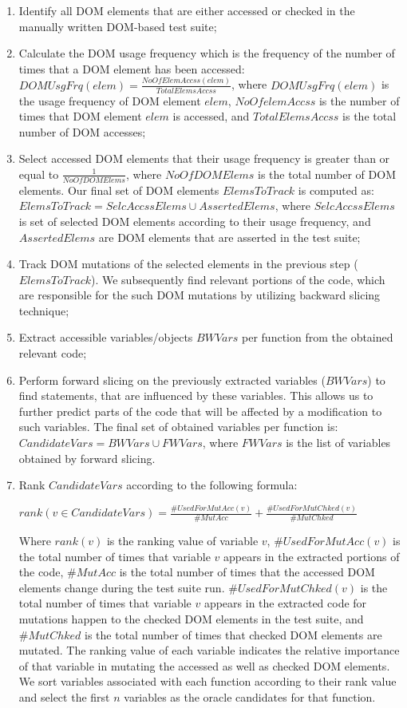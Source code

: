 \begin{enumerate}
\item Identify all DOM elements
that are either accessed or checked in the manually written DOM-based test suite; 
\item Calculate the DOM usage frequency which is the frequency of the number of times that a DOM element has been accessed:
$DOMUsgFrq(elem)=\frac{NoOfElemAccss(elem)}{TotalElemsAccss}$, where $DOMUsgFrq(elem)$ is the usage frequency of DOM element $elem$, $NoOfelemAccss$ is the number of times that DOM element $elem$ is accessed, and $TotalElemsAccss$ is the total number of DOM accesses;
\item Select accessed DOM elements that their usage frequency is greater than or equal to $\frac{1}{NoOfDOMElems}$, where $NoOfDOMElems$ is the total number of DOM elements. Our final set of DOM elements $ElemsToTrack$ is computed as:
$ElemsToTrack=SelcAccssElems\cup AssertedElems$, where $SelcAccssElems$ is set of selected DOM elements according to their usage frequency, and $AssertedElems$ are DOM elements that are asserted in the test suite;    
\item Track DOM mutations of the selected elements in the previous step ($ElemsToTrack$). We subsequently find relevant portions of the code, which are responsible for the such DOM mutations by utilizing backward slicing technique; 
\item Extract accessible variables/objects $BWVars$ per function from the obtained relevant code;
\item Perform forward slicing on the previously extracted variables ($BWVars$) to find statements, that are influenced by these variables. This allows us to further predict parts of the code that will be affected by a modification to such variables. The final set of obtained variables per function is: $CandidateVars=BWVars\cup FWVars$, where $FWVars$ is the list of variables obtained by forward slicing.  
\item Rank $CandidateVars$ according to the following formula:

$rank(v\in CandidateVars)=\frac{\# UsedForMutAcc(v)}{\# MutAcc} + \frac{\# UsedForMutChked(v)}{\# MutChked}$

Where $rank(v)$ is the ranking value of variable $v$, $\# UsedForMutAcc(v)$ is the total number of
times that variable $v$ appears in the extracted portions of the code, $\# MutAcc$ is the total number of times that the
accessed DOM elements change during the test suite run. $\# UsedForMutChked(v)$ is the total
number of times that variable $v$ appears in the extracted code for mutations happen to the checked
DOM elements in the test suite, and $\# MutChked$ is the total number of times that checked DOM
elements are mutated. The ranking value of each variable indicates the relative importance of
that variable in mutating the accessed as well as checked DOM elements. We sort variables
associated with each function according to their rank value and select the first $n$ variables as the
oracle candidates for that function.
\end{enumerate}


